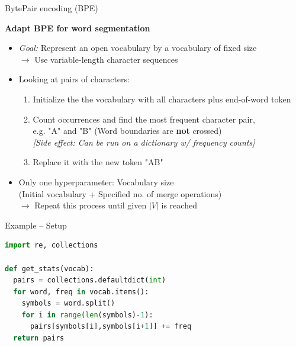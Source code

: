 \documentclass[11pt,compress,t,notes=noshow, xcolor=table]{beamer}
\begin{document}
\begin{vbframe}{BytePair encoding (BPE)}

\vfill

\textbf{Adapt BPE for word segmentation \href{https://www.aclweb.org/anthology/P16-1162.pdf}{}}

	\begin{itemize}
		\item \textit{Goal:} Represent an open vocabulary by a vocabulary of fixed size\\
					$\rightarrow$ Use variable-length character sequences 
		\item Looking at pairs of characters:
			\begin{enumerate}
				\item Initialize the the vocabulary with all characters plus end-of-word token
				\item Count occurrences and find the most frequent character pair,\\
							e.g. "A" and "B" (\warning Word boundaries are \textbf{not} crossed) \\
							\textit{[Side effect: Can be run on a dictionary w/ frequency counts]}
				\item Replace it with the new token "AB"
			\end{enumerate}
		\item Only one hyperparameter: Vocabulary size\\
					(Initial vocabulary + Specified no. of merge operations)\\
					$\rightarrow$ Repeat this process until given $|V|$ is reached
	\end{itemize}

\vfill

\end{vbframe}


\begin{vbframe}{Example -- Setup}

\begin{lstlisting}[language=Python]
import re, collections

def get_stats(vocab):
  pairs = collections.defaultdict(int)
  for word, freq in vocab.items():
    symbols = word.split()
    for i in range(len(symbols)-1):
      pairs[symbols[i],symbols[i+1]] += freq
  return pairs
\end{lstlisting}

\end{vbframe}
\end{document}
